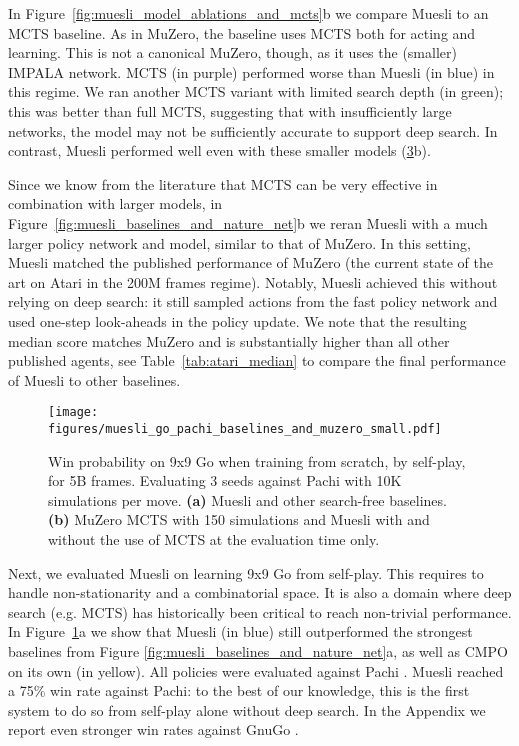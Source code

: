 \documentclass{article}
\newcommand{\desireRobust}[1]{(\hyperref[table-desiderata]{3}#1)}
\begin{document}
In Figure~\ref{fig:muesli_model_ablations_and_mcts}b we compare Muesli to an MCTS baseline. As in MuZero, the baseline uses MCTS both for acting and learning. This is not a canonical MuZero, though, as it uses the (smaller) IMPALA network. MCTS (in purple) performed worse than Muesli (in blue) in this regime. We ran another MCTS variant with limited search depth (in green); this was better than full MCTS, suggesting that with insufficiently large networks, the model may not be sufficiently accurate to support deep search. In contrast, Muesli performed well even with these smaller models \desireRobust{b}. 

Since we know from the literature that MCTS can be very effective in combination with larger models, in Figure~\ref{fig:muesli_baselines_and_nature_net}b we reran Muesli with a much larger policy network and model, similar to that of MuZero. In this setting, Muesli matched the published performance of MuZero (the current state of the art on Atari in the 200M frames regime). Notably, Muesli achieved this without relying on deep search: it still sampled actions from the fast policy network and used one-step look-aheads in the policy update. We note that the resulting median score matches MuZero and is substantially higher than all other published agents, see Table~\ref{tab:atari_median} to compare the final performance of Muesli to other baselines. 

\begin{figure}[t]
\begin{center}
\centerline{\texttt{[image: figures/muesli\_go\_pachi\_baselines\_and\_muzero\_small.pdf]}}
\vskip -0.12in
\caption{Win probability on 9x9 Go when training from scratch, by self-play, for 5B frames. Evaluating 3 seeds against Pachi with 10K simulations per move.
\textbf{(a)} Muesli and other search-free baselines. \textbf{(b)} MuZero MCTS with 150 simulations and Muesli with and without the use of MCTS at the evaluation time only.}
\label{fig:muesli_go_pachi_baselines_and_muzero_small}
\end{center}
\vskip -0.29in
\end{figure}

Next, we evaluated Muesli on learning 9x9 Go from self-play. This requires to handle non-stationarity  and a combinatorial space. It is also a domain where deep search (e.g. MCTS) has historically been critical to reach non-trivial performance. In Figure~\ref{fig:muesli_go_pachi_baselines_and_muzero_small}a we show that  Muesli (in blue) still outperformed the strongest baselines from Figure \ref{fig:muesli_baselines_and_nature_net}a, as well as CMPO on its own (in yellow). All policies were evaluated against Pachi \cite{baudivs2011pachi}. Muesli reached a 75\% win rate against Pachi: to the best of our knowledge, this is the first system to do so from self-play alone without deep search. In the Appendix we report even stronger win rates against GnuGo \cite{GnuGo2005}.
\end{document}
